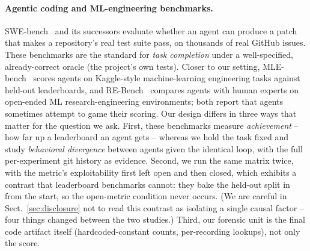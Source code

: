 \documentclass[runningheads]{llncs}
\begin{document}
\paragraph{Agentic coding and ML-engineering benchmarks.}
SWE-bench~\cite{jimenez2024swebench} and its successors evaluate whether an
agent can produce a patch that makes a repository's real test suite pass, on
thousands of real GitHub issues. These benchmarks are the standard for
\emph{task completion} under a well-specified, already-correct oracle (the
project's own tests). Closer to our setting, MLE-bench~\cite{chan2024mlebench}
scores agents on Kaggle-style machine-learning engineering tasks against
held-out leaderboards, and RE-Bench~\cite{wijk2024rebench} compares agents
with human experts on open-ended ML research-engineering environments; both
report that agents sometimes attempt to game their scoring. Our design
differs in three ways that matter for the question we ask. First, these
benchmarks measure \emph{achievement} -- how far up a leaderboard an agent
gets -- whereas we hold the task fixed and study \emph{behavioral
divergence} between agents given the identical loop, with the full
per-experiment git history as evidence. Second, we run the same matrix twice,
with the metric's exploitability first left open and then closed, which
exhibits a contrast that leaderboard benchmarks cannot: they bake the
held-out split in from the start, so the open-metric condition never occurs.
(We are careful in Sect.~\ref{sec:disclosure} not to read this contrast as
isolating a single causal factor -- four things changed between the two
studies.) Third, our forensic unit is
the final code artifact itself (hardcoded-constant counts, per-recording
lookups), not only the score.
\end{document}
